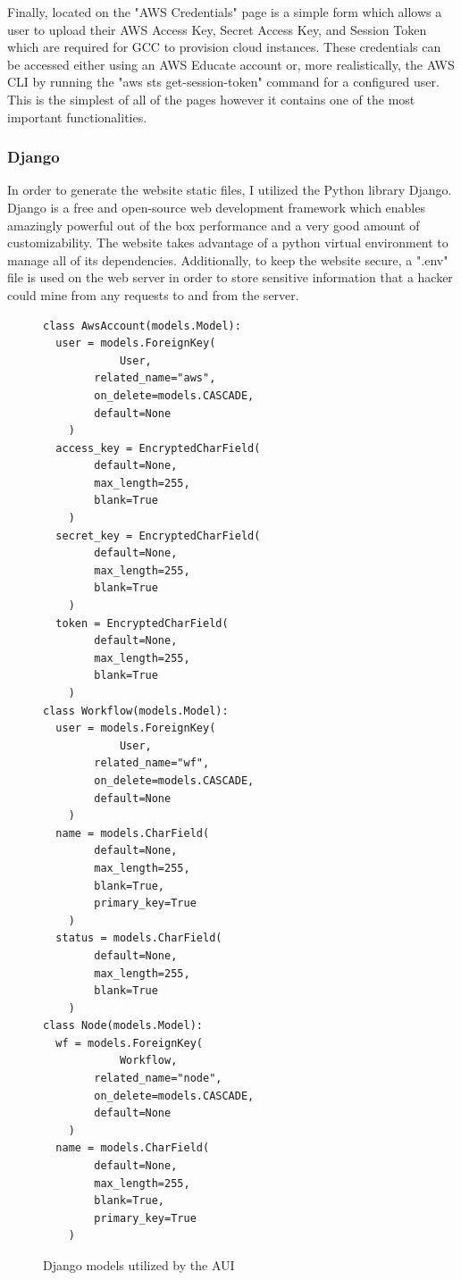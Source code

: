 \documentclass[fleqn,10pt]{SelfArx} %
\begin{document}
Finally, located on the "AWS Credentials" page is a simple form which allows a user to upload their AWS Access Key, Secret Access Key, and Session Token which are required for GCC to provision cloud instances. These credentials can be accessed either using an AWS Educate account or, more realistically, the AWS CLI by running the "aws sts get-session-token" command for a configured user. This is the simplest of all of the pages however it contains one of the most important functionalities.

\subsubsection{Django}

In order to generate the website static files, I utilized the Python library Django. Django is a free and open-source web development framework which enables amazingly powerful out of the box performance and a very good amount of customizability. The website takes advantage of a python virtual environment to manage all of its dependencies. Additionally, to keep the website secure, a ".env" file is used on the web server in order to store sensitive information that a hacker could mine from any requests to and from the server.

\begin{figure}[ht!]
\centering
\begin{tcolorbox}[boxrule=0.5pt,colback=cyan!15!white]
\begin{lstlisting}[basicstyle=\footnotesize, frame=lines]
class AwsAccount(models.Model):
  user = models.ForeignKey(
    		User,
		related_name="aws",
		on_delete=models.CASCADE,
		default=None
  	)
  access_key = EncryptedCharField(
		default=None,
		max_length=255,
		blank=True
	)
  secret_key = EncryptedCharField(
		default=None,
		max_length=255,
		blank=True
	)
  token = EncryptedCharField(
		default=None,
		max_length=255,
		blank=True
	)
class Workflow(models.Model):
  user = models.ForeignKey(
    		User,
		related_name="wf",
		on_delete=models.CASCADE,
		default=None
  	)
  name = models.CharField(
		default=None,
		max_length=255,
		blank=True,
		primary_key=True
	)
  status = models.CharField(
		default=None,
		max_length=255,
		blank=True
	)
class Node(models.Model):
  wf = models.ForeignKey(
    		Workflow,
		related_name="node",
		on_delete=models.CASCADE,
		default=None
  	)
  name = models.CharField(
		default=None,
		max_length=255,
		blank=True,
		primary_key=True
	)
\end{lstlisting}
\end{tcolorbox}
\caption{Django models utilized by the AUI}
\label{fig:djangomodels}
\end{figure}
\end{document}

